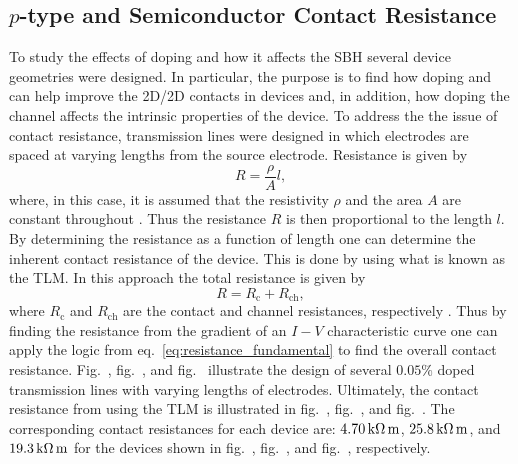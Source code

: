\subsection{$p$-type  and  Semiconductor Contact Resistance}\label{subsec:mos2_doping_contact}
To study the effects of doping and how it affects the \ac{SBH} several  device geometries were designed. In particular, the purpose is to find how doping  and  can help improve the 2D/2D contacts in devices and, in addition, how doping the channel affects the intrinsic properties of the device. To address the the issue of contact resistance, transmission lines were designed in which electrodes are spaced at varying lengths from the source electrode. Resistance is given by 
\begin{equation}\label{eq:resistance_fundamental}
R = \frac{\rho}{A} l,
\end{equation}
where, in this case, it is assumed that the resistivity $\rho$ and the area $A$ are constant throughout \cite{Schroder_Semiconductor2006}. Thus the resistance $R$ is then proportional to the length $l$. By determining the resistance as a function of length one can determine the inherent contact resistance of the device. This is done by using what is known as the \ac{TLM}. In this approach the total resistance is given by
\begin{equation}\label{eq:resistance_tlm}
R = R_\mathrm{c} + R_\mathrm{ch},
\end{equation}
where $R_\mathrm{c}$ and $R_\mathrm{ch}$ are the contact and channel resistances, respectively \cite{Schroder_Semiconductor2006}. Thus by finding the resistance from the gradient of an $I-V$ characteristic curve one can apply the logic from eq.~\ref{eq:resistance_fundamental} to find the overall contact resistance. Fig.~, fig.~, and fig.~ illustrate the design of several $0.05\%$  doped  transmission lines with varying lengths of electrodes. Ultimately, the contact resistance from using the \ac{TLM} is illustrated in fig.~, fig.~, and fig.~. The corresponding contact resistances for each device are: $4.70\,\mathrm{k\Omega}\,\mathrm{m}$, $25.8\,\mathrm{k\Omega}\,\mathrm{m}$, and $19.3\,\mathrm{k\Omega}\,\mathrm{m}$ for the devices shown in fig.~, fig.~, and fig.~, respectively.
